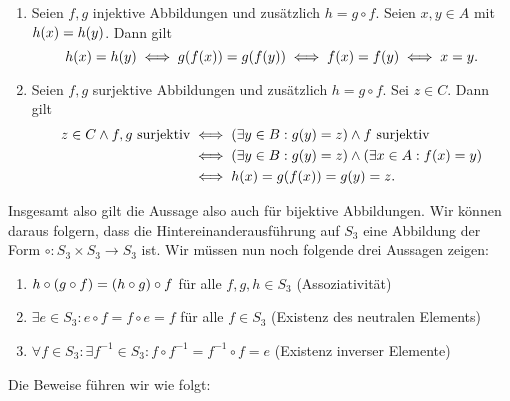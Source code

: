 \documentclass[german,12pt]{homework}
\DeclarePairedDelimiter{\enbrace}{(}{)}
\begin{document}
    \begin{enumerate}
        \item Seien \(f, g\) injektive Abbildungen und zusätzlich \(h = g \circ
        f\). Seien \(x, y \in A\) mit \(h\enbrace*{x} = h\enbrace*{y}\). Dann
        gilt
        \[h\enbrace*{x} = h\enbrace*{y} \iff g\enbrace*{f\enbrace*{x}} =
        g\enbrace*{f\enbrace*{y}} \iff f\enbrace*{x} = f\enbrace*{y} \iff x =
        y.\]
        \item Seien \(f, g\) surjektive Abbildungen und zusätzlich \(h = g
        \circ f\). Sei \(z \in C\). Dann gilt
        \begin{align*}
            z \in C \land f,g\text{ surjektiv} &\iff \enbrace*{{\exists}y \in
            B: g\enbrace*{y} = z} \land f \text{ surjektiv}\\
            &\iff \enbrace*{{\exists}y \in B: g\enbrace*{y} = z} \land
            \enbrace*{{\exists}x \in A: f\enbrace*{x} = y}\\
            &\iff h\enbrace*{x} = g\enbrace*{f\enbrace*{x}} = g\enbrace*{y} = z.
        \end{align*}
    \end{enumerate}
    Insgesamt also gilt die Aussage also auch für bijektive Abbildungen. Wir
    können daraus folgern, dass die Hintereinanderausführung auf \(S_3\) eine
    Abbildung der Form \(\circ: S_3 \times S_3 \to S_3\) ist. Wir müssen nun
    noch folgende drei Aussagen zeigen:
    \begin{enumerate}
        \item \(h \circ \enbrace*{g \circ f} = \enbrace*{h \circ g} \circ f\)
        für alle \(f, g, h \in S_3\) (Assoziativität)
        \item \({\exists}e \in S_3: e \circ f = f \circ e = f\) für alle \(f
        \in S_3\) (Existenz des neutralen Elements)
        \item \({\forall}f \in S_3: {\exists}f^{-1} \in S_3: f \circ f^{-1} =
        f^{-1} \circ f = e\) (Existenz inverser Elemente)
    \end{enumerate}
    Die Beweise führen wir wie folgt:
\end{document}
